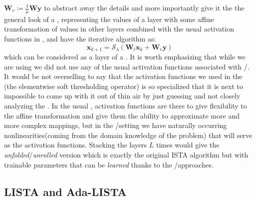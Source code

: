 $\boldsymbol{W}_e \coloneqq \frac{1}{\mu}\boldsymbol{W}\boldsymbol{y}$ to abstract away the details and more importantly give it the the general look of a \nn, representing the values of a layer with 
some affine transformation of values in other layers combined with the usual activation functions in \nn, and have the iterative algorithm 
as:
\begin{equation*}
  \boldsymbol{x}_{k+1} = \mathcal{S}_\lambda\left(\boldsymbol{W}_t\boldsymbol{x}_{k}+\boldsymbol{W}_e\boldsymbol{y}\right)
\end{equation*}
which can be considered as a layer of a \nn. It is worth emphasizing that 
while we are using \nns we did not use any of the usual activation functions associated with \ml/\dl. 
It would be not overselling to say that the activation functions we used in the \srp(the elementwise soft thresholding operator) is so 
specialized that it is next to impossible to come up with it out of thin air by just guessing and not closely analyzing the \srp.
In the usual \nns, activation functions are there to give flexibility to the affine transformation 
and give them the ability to approximate more and more complex mappings, but in the \du/\au setting we have naturally occurring 
nonlinearities(coming from the domain knowledge of the problem) that will serve as the activation 
functions. Stacking the layers $L$ times would give the \emph{unfolded}/\emph{unrolled} version which is exactly the original \ac{ISTA} algorithm but with 
trainable parameters that can be \emph{learned} thanks to the \ml/\dl approaches.

\subsection{LISTA and Ada-LISTA}

